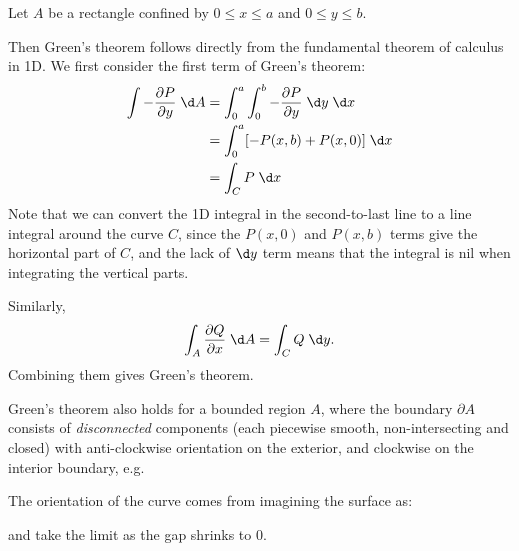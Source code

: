 \documentclass[a4paper]{article}
\begin{document}
\begin{eg}
  Let $A$ be a rectangle confined by $0 \leq x \leq a$ and $0 \leq y \leq b$.
  \begin{center}
  \end{center}
  Then Green's theorem follows directly from the fundamental theorem of calculus in 1D. We first consider the first term of Green's theorem:
  \begin{align*}
    \int -\frac{\partial P}{\partial y} \;\d A &= \int_0^a \int_0^b -\frac{\partial P}{\partial y}\;\d y\;\d x\\
    &= \int_0^a [-P(x, b) + P(x, 0)]\;\d x\\
    &= \int_C P\;\d x
  \end{align*}
  Note that we can convert the 1D integral in the second-to-last line to a line integral around the curve $C$, since the $P(x, 0)$ and $P(x, b)$ terms give the horizontal part of $C$, and the lack of $\d y$ term means that the integral is nil when integrating the vertical parts.

  Similarly,
  \[
    \int_A \frac{\partial Q}{\partial x}\;\d A = \int_C Q\;\d y.
  \]
  Combining them gives Green's theorem.
\end{eg}

Green's theorem also holds for a bounded region $A$, where the boundary $\partial A$ consists of \emph{disconnected} components (each piecewise smooth, non-intersecting and closed) with anti-clockwise orientation on the exterior, and clockwise on the interior boundary, e.g.
\begin{center}
\end{center}
The orientation of the curve comes from imagining the surface as:
\begin{center}
\end{center}
and take the limit as the gap shrinks to 0.
\end{document}
